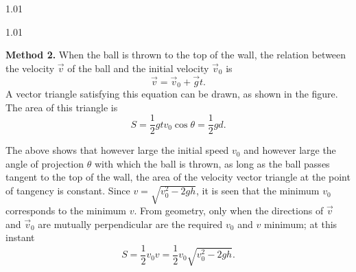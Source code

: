 \begin{solution}{1.01}
\begin{figbox}{1.01}
\end{figbox}

\textbf{Method 2.} When the ball is thrown to the top of the wall, the relation between the
velocity $\vec{v}$ of the ball and the initial velocity $\vec{v}_0$ is
\begin{equation*}
\vec{v} = \vec{v}_0 + \vec{g}t.
\end{equation*}
A vector triangle satisfying this equation can be drawn, as shown in the figure. The area of
this triangle is
\begin{equation}
S = \frac{1}{2}gtv_0\cos\theta = \frac{1}{2}gd. \tag{5}
\end{equation}

The above shows that however large the initial speed $v_0$ and however large the angle of
projection $\theta$ with which the ball is thrown, as long as the ball passes tangent to the top
of the wall, the area of the velocity vector triangle at the point of tangency is constant.
Since $v=\sqrt{v_0^2-2gh}$, it is seen that the minimum $v_0$ corresponds to the minimum $v$.
From geometry, only when the directions of $\vec{v}$ and $\vec{v}_0$ are mutually perpendicular
are the required $v_0$ and $v$ minimum; at this instant
\begin{equation}
S = \frac{1}{2}v_0v = \frac{1}{2}v_0\sqrt{v_0^2-2gh}. \tag{6}
\end{equation}


\end{solution}
